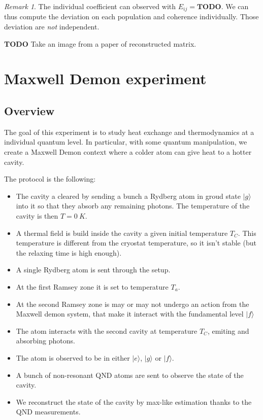 \documentclass[10pt]{report}
\theoremstyle{plain}
\theoremstyle{definition}
\theoremstyle{remark}
\newtheorem*{rem}{Remark}
\newcommand{\TODO}{\textbf{TODO}}
\newcommand{\ket}[1]{|#1\rangle}
\begin{document}
\begin{rem} The individual coefficient can observed with $E_{ij} = \TODO$. We
  can thus compute the deviation on each population and coherence individually.
  Those deviation are \emph{not} independent.
\end{rem}

\TODO{} Take an image from a paper of reconstructed matrix.

\section{Maxwell Demon experiment}

\subsection{Overview}

The goal of this experiment is to study heat exchange and thermodynamics at a
individual quantum level. In particular, with some quantum manipulation, we
create a Maxwell Demon context where a colder atom can give heat to a hotter
cavity.

The protocol is the following:

\begin{itemize}
\item The cavity a cleared by sending a bunch a Rydberg atom in groud state
  $\ket g$ into it so that they absorb any remaining photons. The temperature of
  the cavity is then $T = \SI{0}{K}$.
\item A thermal field is build inside the cavity a given initial temperature
  $T_C$. This temperature is different from the cryostat temperature, so it
  isn't stable (but the relaxing time is high enough).
\item A single Rydberg atom is sent through the setup.
\item At the first Ramsey zone it is set to temperature $T_a$.
\item At the second Ramsey zone is may or may not undergo an action from the Maxwell
  demon system, that make it interact with the fundamental level $\ket f$
\item The atom interacts with the second cavity at temperature $T_C$, emiting
  and absorbing photons.
\item The atom is observed to be in either $\ket e$, $\ket g$ or $\ket f$.
\item A bunch of non-resonant QND atoms are sent to observe the state of the cavity.
\item We reconstruct the state of the cavity by max-like estimation thanks to
  the QND measurements.
\end{itemize}
\end{document}
